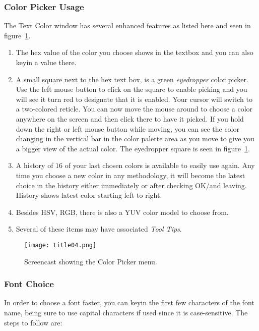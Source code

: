 \subsubsection*{Color Picker Usage}%
\label{ssub:color_picker_usage}

The Text Color window has several enhanced features as listed here and seen in figure~\ref{fig:title04}.

\begin{enumerate}
    \item The hex value of the color you choose shows in the textbox and you can also keyin a value there.
    \item A small square next to the hex text box, is a green \textit{eyedropper} color picker. Use the left mouse button to click on the square to enable picking and you will see it turn red to designate that it is enabled. Your cursor will switch to a two-colored reticle. You can now move the mouse around to choose a color anywhere on the screen and then click there to have it picked. If you hold down the right or left mouse button while moving, you can see the color changing in the vertical bar in the color palette area as you move to give you a bigger view of the actual color. The eyedropper square is seen in figure~\ref{fig:title04}.
    \item A history of $16$ of your last chosen colors is available to easily use again. Any time you choose a new color in any methodology, it will become the latest choice in the history either immediately or after checking OK/and leaving. History shows latest color starting left to right.
    \item Besides HSV, RGB, there is also a YUV color model to choose from.
    \item Several of these items may have associated \textit{Tool Tips}.
\end{enumerate}

\begin{figure}[hbtp]
    \centering
    \texttt{[image: title04.png]}
    \caption{Screencast showing the Color Picker menu.}
    \label{fig:title04}
\end{figure}

\subsubsection*{Font Choice}%
\label{ssub:font_choice}

In order to choose a font faster, you can keyin the first few characters of the font name, being sure to use capital characters if used since it is case-sensitive. The steps to follow are:

